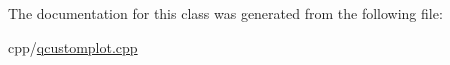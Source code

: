 \begin{DoxyCodeInclude}
\end{DoxyCodeInclude}


The documentation for this class was generated from the following file\+:\begin{DoxyCompactItemize}
\item 
cpp/\mbox{\hyperlink{qcustomplot_8cpp}{qcustomplot.\+cpp}}\end{DoxyCompactItemize}
